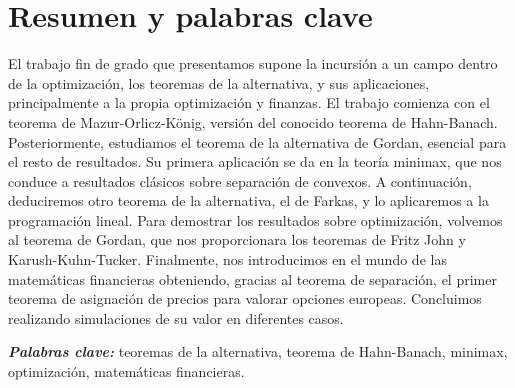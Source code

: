 \chapter{Resumen y palabras clave}

El trabajo fin de grado que presentamos supone la incursión a un campo dentro de la optimización, los teoremas de la alternativa, y sus aplicaciones, principalmente a la propia optimización y finanzas. El trabajo comienza con el teorema de Mazur-Orlicz-König, versión del conocido teorema de Hahn-Banach. Posteriormente, estudiamos el teorema de la alternativa de Gordan, esencial para el resto de resultados. Su primera aplicación se da en la teoría minimax, que nos conduce a resultados clásicos sobre separación de convexos. A continuación, deduciremos otro teorema de la alternativa, el de Farkas, y lo aplicaremos a la programación lineal. Para demostrar los resultados sobre optimización, volvemos al teorema de Gordan, que nos proporcionara los teoremas de Fritz John y Karush-Kuhn-Tucker. Finalmente, nos introducimos en el mundo de las matemáticas financieras obteniendo, gracias al teorema de separación, el primer teorema de asignación de precios para valorar opciones europeas. Concluimos realizando simulaciones de su valor en diferentes casos.\\

\providecommand{\pclave}[1]
{
	\small	
	\textbf{\textit{Palabras clave: }} #1
}
\pclave{teoremas de la alternativa, teorema de Hahn-Banach, minimax, optimización, matemáticas financieras.}